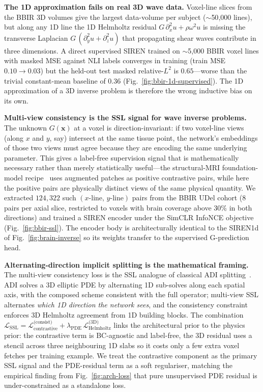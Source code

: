 \documentclass[11pt,letterpaper]{article}
\newcommand{\xvec}{\bm{x}}
\begin{document}
\textbf{The 1D approximation fails on real 3D wave data.}
Voxel-line slices from the BBIR 3D volumes give the largest
data-volume per subject ($\sim$50{,}000 lines), but along any 1D line
the 1D Helmholtz residual $G\,\partial_x^2 u+\rho\omega^2 u$ is
missing the transverse Laplacian $G\,(\partial_y^2 u+\partial_z^2
u)$ that propagating shear waves contribute in three dimensions. A
direct supervised SIREN trained on $\sim$5{,}000 BBIR voxel lines
with masked MSE against NLI labels converges in training (train
MSE $0.10 \to 0.03$) but the held-out test masked relative-$L^2$ is
$0.65$---worse than the trivial constant-mean baseline of $0.36$
(Fig.~\ref{fig:bbir-1d-supervised}). The 1D approximation of a 3D
inverse problem is therefore the wrong inductive bias on its own.

\textbf{Multi-view consistency is the SSL signal for wave inverse
problems.}
The unknown $G(\xvec)$ at a voxel is direction-invariant: if two
voxel-line views (along $x$ and $y$, say) intersect at the same
tissue point, the network's embeddings of those two views must agree
because they are encoding the same underlying parameter. This gives
a label-free supervision signal that is mathematically necessary
rather than merely statistically useful---the structural-MRI
foundation-model recipe~\cite{tak2026brainiac} uses augmented
patches as positive contrastive pairs, while here the positive
pairs are physically distinct views of the same physical quantity.
We extracted $124{,}322$ such $(x\text{-line},\,y\text{-line})$ pairs
from the BBIR UDel cohort (8 pairs per axial slice, restricted to
voxels with brain coverage above 30\% in both directions) and
trained a SIREN encoder under the SimCLR InfoNCE
objective~\cite{chen2020simclr} (Fig.~\ref{fig:bbir-ssl}). The
encoder body is architecturally identical to the SIREN1d of
Fig.~\ref{fig:brain-inverse} so its weights transfer to the
supervised G-prediction head.

\textbf{Alternating-direction implicit splitting is the mathematical
framing.}
The multi-view consistency loss is the SSL analogue of classical
ADI splitting~\cite{peaceman1955adi}. ADI solves a 3D elliptic PDE by
alternating 1D sub-solves along each spatial axis, with the composed
scheme consistent with the full operator; multi-view SSL alternates
\emph{which 1D direction the network sees}, and the consistency
constraint enforces 3D Helmholtz agreement from 1D building blocks.
The combination $\mathcal{L}_{\text{SSL}}=
\mathcal{L}^{\text{(consist)}}_{\text{contrastive}}+
\lambda_{\text{PDE}}\,\mathcal{L}^{\text{(3D)}}_{\text{Helmholtz}}$
links the architectural prior to the physics prior: the contrastive
term is BC-agnostic and label-free, the 3D residual uses a stencil
across three neighbouring 1D slabs so it costs only a few extra
voxel fetches per training example. We treat the contrastive
component as the primary SSL signal and the PDE-residual term as a
soft regulariser, matching the empirical finding from
Fig.~\ref{fig:arch-loss} that pure unsupervised PDE residual is
under-constrained as a standalone loss.
\end{document}
